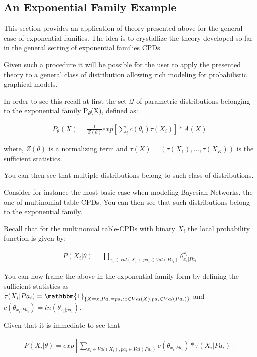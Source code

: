 \documentclass[11pt]{article}
\begin{document}
\begin{article}
\subsection{An Exponential Family Example}
\label{sec:org28ce42f}

This section provides an application of theory presented above for
the general case of exponential families. The idea is to
crystallize the theory developed so far in the general setting of
exponential families CPDs.

Given such a procedure it will be possible for the user to apply
the presented theory to a general class of distribution allowing
rich modeling for probabilistic graphical models.

In order to see this recall at first the set \(\mathscr{Q}\) of
parametric distributions belonging to the exponential family
P\textsubscript{\(\theta\)}(X), defined as:

\begin{align} \label{eq:exponential-family}
P_{\theta}(X) = \frac{1}{Z(\theta)} exp[\sum_i c(\theta_i)\tau(X_i)] * A(X)
\end{align}

where, \(Z(\theta)\) is a normalizing term and \(\tau(X) = (\tau(X_1),
    ..., \tau(X_K))\) is the sufficient statistics.

You can then see that multiple distributions belong to such class
of distributions.

Consider for instance the most basic case when modeling Bayesian
Networks, the one of multinomial table-CPDs. You can then see that
such distributions belong to the exponential family.

Recall that for the multinomial table-CPDs with binary \(X_i\) the
local probability function is given by:

\begin{align} \label{eq:multinomial-cpd}
P(X_i|\theta) = \prod_{x_i \in Val(X_i), pa_i \in Val(Pa_i)} \theta_{x_i | Pa_i}^{x_i}
\end{align}

You can now frame the above in the exponential family form by
defining the sufficient statistics as \(\tau(X_i | Pa_i) =
    \mathbbm{1}_{\{X = x, Pa_i = pa_i : x \in Val(X), pa_i \in
    Val(Pa_i)\}}\) and \(c(\theta_{x_i | Pa_i}) = ln(\theta_{x_i |
    pa_i})\).

Given that it is immediate to see that

\begin{align} \label{eq:multinomial-cpd}
P(X_i|\theta) = exp[\sum_{x_i \in Val(X_i), pa_i \in Val(Pa_i)} c(\theta_{x_i | Pa_i}) * \tau(X_i | Pa_i)] 
\end{align}


\end{article}
\end{document}
